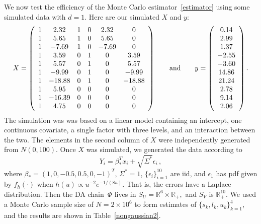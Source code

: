 \documentclass[11pt]{article}
\begin{document}
	We now test the efficiency of the Monte Carlo
        estimator~\eqref{estimator} using some simulated data with
        $d=1$.  Here are our simulated $X$ and $y$:
	\[
	X = 	\left(
	{\begin{array}{cccccc}
		1 & 2.32 & 1 & 0 & 2.32 & 0 \\
		1 & 5.65 & 1 & 0 & 5.65 & 0 \\
		1 & -7.69 & 1 & 0 & -7.69 & 0 \\
		1 & 3.59 & 0 & 1 & 0 & 3.59 \\
		1 & 5.57 & 0 & 1 & 0 & 5.57 \\
		1 & -9.99 & 0 & 1 & 0 & -9.99 \\
		1 & -18.88 & 0 & 1 & 0 & -18.88 \\
		1 & 5.95 & 0 & 0 & 0 & 0 \\
		1 & -16.39 & 0 & 0 & 0 & 0 \\
		1 & 4.75 & 0 & 0 & 0 & 0
              \end{array}}
          \right) \hspace*{7mm} \mbox{and} \hspace*{7mm}
          y = \left(
	\begin{array}{c}
		0.14 \\ 2.99 \\ 1.37 \\ -2.55 \\ -3.60 \\ 14.86 \\
		21.24 \\ 2.78 \\ 9.14 \\ 2.06
	\end{array}
	\right).
	\]
        The simulation was was based on a linear model containing an
        intercept, one continuous covariate, a single factor with
        three levels, and an interaction between the two.  The
        elements in the second column of $X$ were independently
        generated from $N(0,100)$.  Once $X$ was simulated, we
        generated the data according to
	\[
	Y_i = \beta_*^T x_i + \sqrt{\Sigma^*} \epsilon_i \,,
	\]
	where $\beta_* = (1,0,-0.5,0.5,0,-1)^T$, $\Sigma^*=1$,
        $\{\epsilon_i\}_{i=1}^{10}$ are iid, and $\epsilon_1$ has pdf
        given by $f_h(\cdot)$ when $h(u) \propto u^{-2}e^{-1/(8u)}$.
        That is, the errors have a Laplace distribution. Then the DA
        chain~$\Phi$ lives in $S_U = \mathbb{R}^6 \times
        \mathbb{R}_+,$ and $S_V$ is $\mathbb{R}_+^{10}$.  We used a
        Monte Carlo sample size of $N = 2 \times 10^6$ to form
        estimates of $\{s_k,l_k,u_k\}_{k=1}^4$, and the results are
        shown in Table~\ref{nongaussian2}.
\end{document}
